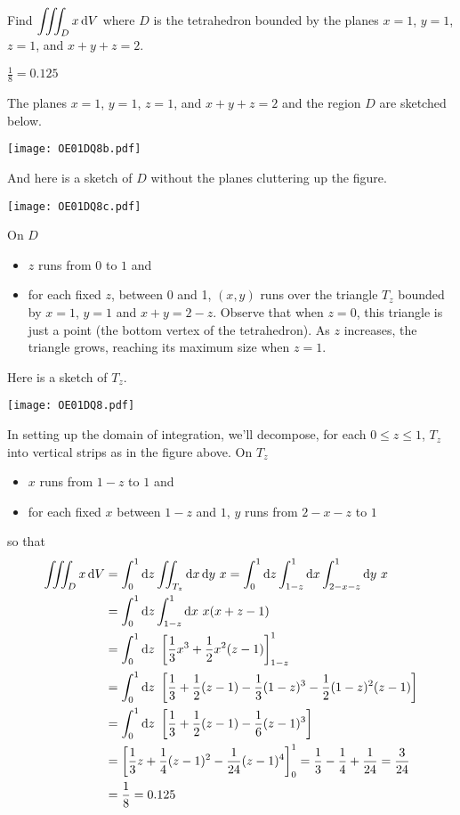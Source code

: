 \begin{question} [M200 2001D] %
Find $\displaystyle\iiint_D x\,\mathrm{d}V$ where $D$ is the tetrahedron bounded
by the planes $x=1$, $y=1$, $z=1$, and $x+y+z=2$.
\end{question}

%

\begin{answer}
$\frac{1}{8}=0.125$
\end{answer}

\begin{solution}
The planes $x=1$, $y=1$, $z=1$, and $x+y+z=2$ and the region $D$ are 
sketched below.
\begin{center}
     \texttt{[image: OE01DQ8b.pdf]}
\end{center}
And here is a sketch of $D$ without the planes cluttering up the figure.
\begin{center}
     \texttt{[image: OE01DQ8c.pdf]}
\end{center}
On $D$
\begin{itemize}
\item
$z$ runs from $0$ to $1$ and
\item
for each fixed $z$, between 0 and 1, $(x,y)$ runs over the
triangle $T_z$ bounded by $x=1$, $y=1$ and $x+y=2-z$. Observe that when $z=0$,
this triangle is just a point (the bottom vertex of the tetrahedron). 
As $z$ increases, the triangle grows, reaching its maximum size when $z=1$.
\end{itemize}
Here is a sketch of $T_z$.
\begin{center}
     \texttt{[image: OE01DQ8.pdf]}
\end{center}
In setting up the domain of integration, we'll decompose, for each 
$0\le z\le   1$, $T_z$ into vertical strips as in the figure above.
On $T_z$
\begin{itemize}
\item
$x$ runs from $1-z$ to $1$ and
\item
for each fixed $x$ between $1-z$ and $1$, $y$ runs from $2-x-z$ to $1$
\end{itemize}
so that
\begin{align*}
\iiint_D x\,\mathrm{d}V
&=\int_0^1\mathrm{d}z\iint_{T_z}\mathrm{d}x\,\mathrm{d}y\ x
=\int_0^1 \mathrm{d}z\int_{1-z}^1 \mathrm{d}x\int_{2-x-z}^1 \mathrm{d}y\ x \\
&=\int_0^1 \mathrm{d}z\int_{1-z}^1 \mathrm{d}x\ x(x+z-1)\\
&=\int_0^1 \mathrm{d}z\ \left[\frac{1}{3}x^3+\frac{1}{2} x^2(z-1)\right]_{1-z}^1\\
&=\int_0^1 \mathrm{d}z\ \left[\frac{1}{3}+\frac{1}{2} (z-1)-\frac{1}{3}(1-z)^3
-\frac{1}{2}(1-z)^2(z-1)\right]\\
&=\int_0^1 \mathrm{d}z\ \left[\frac{1}{3}+\frac{1}{2} (z-1)
                               -\frac{1}{6}(z-1)^3\right]\\
&=\left[\frac{1}{3}z+\frac{1}{4} (z-1)^2-\frac{1}{24}(z-1)^4\right]_0^1
=\frac{1}{3}-\frac{1}{4}+\frac{1}{24}=\frac{3}{24} \\
&=\frac{1}{8}=0.125
\end{align*}
\end{solution}

